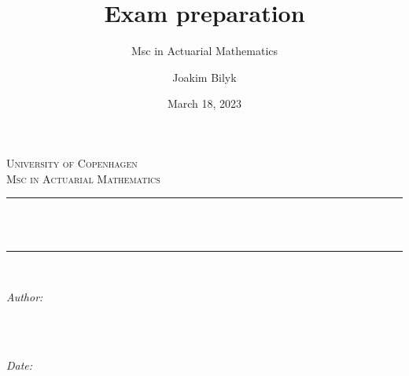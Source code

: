 \documentclass[
]{book}
\title{Exam preparation}
\subtitle{Msc in Actuarial Mathematics}
\author{Joakim Bilyk}
\date{March 18, 2023}
\begin{document}


{
\begin{titlepage}
\newcommand{\HRule}{\rule{\linewidth}{0.5mm}} %

\center %
 

\textsc{\LARGE University of Copenhagen}\\[4cm] %
\textsc{\Large Msc in Actuarial Mathematics}\\[0.5cm] %


\HRule \\[0.4cm]
{ \huge \bfseries \thetitle}\\[0.4cm] %
\HRule \\[1.5cm]
 

\begin{minipage}{0.4\textwidth}
\begin{flushleft} \large
\emph{Author:}\\
\textsc{\theauthor} \\
\end{flushleft}
\end{minipage}
~
\begin{minipage}{0.4\textwidth}
\begin{flushright} \large
\emph{Date:} \\
\textsc{\thedate} \\
\end{flushright}
\end{minipage}\\[2cm]


\end{titlepage}}
\end{document}
